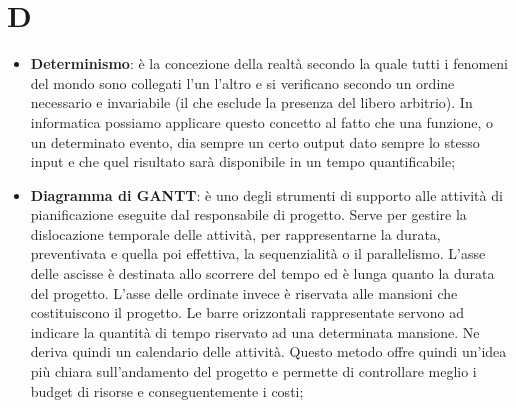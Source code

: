 % 
%
%

\section{D}

\begin{itemize}
	\item \textbf{Determinismo}: è la concezione della realtà secondo la quale tutti i fenomeni del mondo sono collegati l’un l’altro e si verificano secondo un ordine necessario e invariabile (il che esclude la presenza del libero arbitrio). \newline
In informatica possiamo applicare questo concetto al fatto che una funzione, o un determinato evento, dia sempre un certo output dato sempre lo stesso input e che quel risultato sarà disponibile in un tempo quantificabile;

	\item \textbf {Diagramma di GANTT}: è uno degli strumenti di supporto alle attività di pianificazione eseguite dal responsabile di progetto. \newline
Serve per gestire la dislocazione temporale delle attività, per rappresentarne la durata, preventivata e quella poi effettiva, la sequenzialità o il parallelismo. \newline
L'asse delle ascisse è destinata allo scorrere del tempo ed è lunga quanto la durata del progetto. \newline
L'asse delle ordinate invece è riservata alle mansioni che costituiscono il progetto. \newline
Le barre orizzontali rappresentate servono ad indicare la quantità di tempo riservato ad una determinata mansione. Ne deriva quindi un calendario delle attività. \newline
Questo metodo offre quindi un'idea più chiara sull'andamento del progetto e permette di controllare meglio i budget di risorse e conseguentemente i costi;


\end{itemize}
